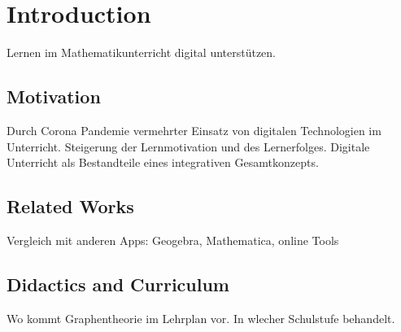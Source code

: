 \chapter{Introduction}\label{sec:intro}
Lernen im Mathematikunterricht digital unterst\"utzen.

\section{Motivation}\label{sec:motivation}
Durch Corona Pandemie vermehrter Einsatz von digitalen Technologien im Unterricht.
Steigerung der Lernmotivation und des Lernerfolges.
Digitale Unterricht als Bestandteile eines integrativen Gesamtkonzepts.

\section{Related Works}\label{sec:works}
Vergleich mit anderen Apps:
Geogebra, Mathematica, online Tools


\section{Didactics and Curriculum}\label{sec:lehrplan}
Wo kommt Graphentheorie im Lehrplan vor. In wlecher Schulstufe behandelt. 
